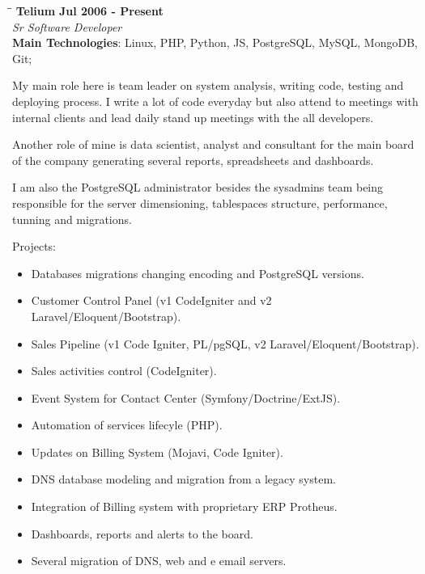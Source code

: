 \documentclass[margin]{res}
\begin{document}
\begin{resume}
\vspace{-0.1in}
   \begin{tabbing}
   \hspace{2.3in}\= \hspace{1.7in}\= \kill %
    \textbf{Telium}    \>\>\textbf{Jul 2006 - Present}\\
    \textit{Sr Software Developer}\\        
    \textbf{Main Technologies}: Linux, PHP, Python, JS, PostgreSQL, MySQL, MongoDB, Git;
   \end{tabbing}\vspace{-20pt}      %
    \vspace{2mm}
    My main role here is team leader on system analysis, writing code, testing and deploying process. I write a lot of code everyday but also attend to meetings with internal clients and lead daily stand up meetings with the all developers.

    Another role of mine is data scientist, analyst and consultant for the main board of the company generating several reports, spreadsheets and dashboards.

    I am also the PostgreSQL administrator besides the sysadmins team being responsible for the server dimensioning, tablespaces structure, performance, tunning and migrations.

    Projects:
    \begin{itemize}
      \item Databases migrations changing encoding and PostgreSQL versions.
      \item Customer Control Panel (v1 CodeIgniter and v2 Laravel/Eloquent/Bootstrap).
      \item Sales Pipeline (v1 Code Igniter, PL/pgSQL, v2 Laravel/Eloquent/Bootstrap).
      \item Sales activities control (CodeIgniter).
      \item Event System for Contact Center (Symfony/Doctrine/ExtJS).
      \item Automation of services lifecyle (PHP).
      \item Updates on Billing System (Mojavi, Code Igniter).
      \item DNS database modeling and migration from a legacy system.
      \item Integration of Billing system with proprietary ERP Protheus.
      \item Dashboards, reports and alerts to the board.
      \item Several migration of DNS, web and e email servers.
    \end{itemize}


\end{resume}
\end{document}
